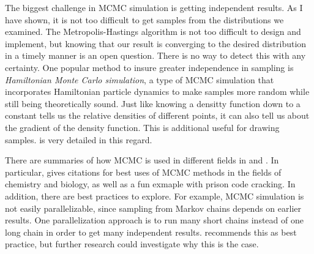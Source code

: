 \documentclass[11pt]{amsart}
\theoremstyle{theorem} %
\theoremstyle{definition}                  %
\theoremstyle{example}                       %
\theoremstyle{remark}                       %
\numberwithin{equation}{section}
\begin{document}
    
    The biggest challenge in MCMC simulation is getting independent results. As I have shown, it is not too difficult to get samples from the distributions we examined. The Metropolis-Hastings algorithm is not too difficult to design  and implement, but knowing that our result is converging to the desired distribution in a timely manner is an open question. There is no way to detect this with any certainty. One popular method to insure greater independence in sampling is \emph{Hamiltonian Monte Carlo simulation}, a type of MCMC simulation that incorporates Hamiltonian particle dynamics to make samples more random while still being theoretically sound. Just like knowing a densitty function down to a constant tells us the relative densities of different points, it can also tell us about the gradient of the density function. This is additional useful for drawing samples. \cite{mcmc} is very detailed in this regard.
    
    There are summaries of how MCMC is used in different fields in \cite{mcmc} and \cite{rev}. In particular, \cite{rev} gives citations for best uses of MCMC methods in the fields of chemistry and biology, as well as a fun exmaple with prison code cracking. In addition, there are best practices to explore. For example, MCMC simulation is not easily parallelizable, since sampling from Markov chains depends on earlier results. One parallelization approach is to run many short chains instead of one long chain in order to get many independent results. \cite{mcmc} recommends this as best practice, but further research could investigate why this is the case.
    
\end{document}
